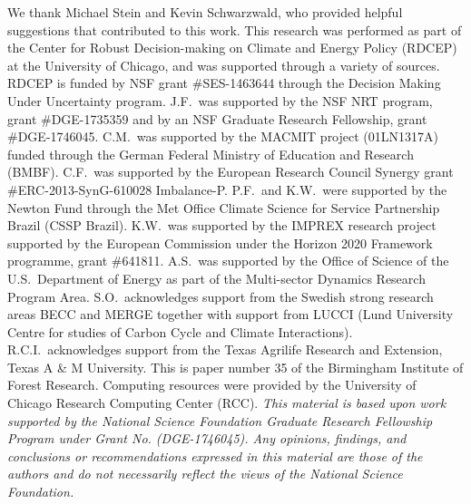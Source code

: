 \documentclass[gmd, manuscript]{copernicus} %
\begin{document}
\begin{acknowledgements}
We thank Michael Stein and Kevin Schwarzwald, who provided helpful suggestions that contributed to this work. 
This research was performed as part of the Center for Robust Decision-making on Climate and Energy Policy (RDCEP) at the University of Chicago, and was supported through a variety of sources. 
RDCEP is funded by NSF grant \#SES-1463644 through the Decision Making Under Uncertainty program. 
J.F.\ was supported by the NSF NRT program, grant \#DGE-1735359 and by an NSF Graduate Research Fellowship, grant \#DGE-1746045. 
C.M.\ was supported by the MACMIT project (01LN1317A) funded through the German Federal Ministry of Education and Research (BMBF). 
C.F.\ was supported by the European Research Council Synergy grant \#ERC-2013-SynG-610028 Imbalance-P. 
P.F.\ and K.W.\ were supported  by the Newton Fund through the Met Office Climate Science for Service Partnership Brazil (CSSP Brazil). 
K.W.\ was supported by the IMPREX research project supported by the European Commission under the Horizon 2020 Framework programme, grant \#641811. 
A.S.\ was supported by the Office of Science of the U.S.\ Department of Energy as part of the Multi-sector Dynamics Research Program Area. 
S.O.\ acknowledges support from the Swedish strong research areas BECC and MERGE together with support from LUCCI (Lund University Centre for studies of Carbon Cycle and Climate Interactions). 
R.C.I.\ acknowledges support from the Texas Agrilife Research and Extension, Texas A \& M University. 
This is paper number 35 of the Birmingham Institute of Forest Research. 
Computing resources were provided by the University of Chicago Research Computing Center (RCC).
\vspace{1cm}
\textit{This material is based upon work supported by the National Science Foundation Graduate Research Fellowship Program under Grant No. (DGE-1746045). 
Any opinions, findings, and conclusions or recommendations expressed in this material are those of the authors and do not necessarily reflect the views of the National Science Foundation.}
\end{acknowledgements}



\end{document}
